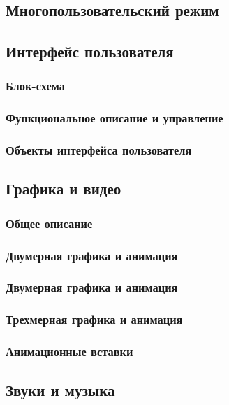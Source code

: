 \documentclass{article}
\begin{document}
\subsection{Многопользовательский режим}

\subsection{Интерфейс пользователя}
\subsubsection{Блок-схема}

\subsubsection{Функциональное описание и управление}

\subsubsection{Объекты интерфейса пользователя}

\subsection{Графика и видео}
\subsubsection{Общее описание}
\subsubsection{Двумерная графика и анимация}
\subsubsection{Двумерная графика и анимация}
\subsubsection{Трехмерная графика и анимация}
\subsubsection{Анимационные вставки}
\subsection{Звуки и музыка}
\end{document}
